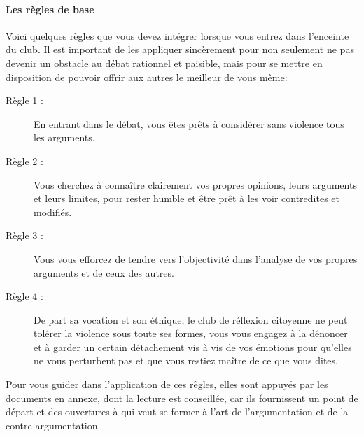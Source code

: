 \documentclass[a4paper,12pt]{article}
\begin{document}
\paragraph{Les règles de base}
Voici quelques règles que vous devez intégrer lorsque vous entrez dans l'enceinte du club. Il est important de les appliquer sincèrement pour non seulement ne pas devenir un obstacle au débat rationnel et paisible, mais pour se mettre en disposition de pouvoir offrir aux autres le meilleur de vous même:
\begin{description}
 \item[Règle 1 :] En entrant dans le débat, vous êtes prêts à considérer sans violence tous les arguments.
 \item[Règle 2 :] Vous cherchez à connaître clairement vos propres opinions, leurs arguments et leurs limites, pour rester humble et être prêt à les voir contredites et modifiés.
 \item[Règle 3 :] Vous vous efforcez de tendre vers l'objectivité dans l'analyse de vos propres arguments et de ceux des autres.
 \item[Règle 4 :] De part sa vocation et son éthique, le club de réflexion citoyenne ne peut tolérer la violence sous toute ses formes, vous vous engagez à la dénoncer et à garder un certain détachement vis à vis de vos émotions pour qu'elles ne vous perturbent pas et que vous restiez maître de ce que vous dites.
\end{description}
Pour vous guider dans l'application de ces rêgles, elles sont appuyés par les documents en annexe, dont la lecture est conseillée, car ils fournissent un point de départ et des ouvertures à qui veut se former à l'art de l'argumentation et de la contre-argumentation. 
\end{document}
